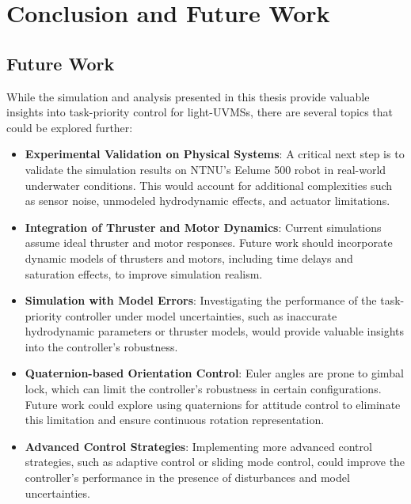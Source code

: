 \chapter{Conclusion and Future Work}

\section{Future Work}

While the simulation and analysis presented in this thesis provide valuable 
insights into task-priority control for light-UVMSs, there are several topics
that could be explored further:

\begin{itemize}
    \item \textbf{Experimental Validation on Physical Systems}: A critical next step is to 
validate the simulation results on NTNU's Eelume 500 robot in real-world 
underwater conditions. This would account for additional complexities such as 
sensor noise, unmodeled hydrodynamic effects, and actuator 
limitations.

    \item \textbf{Integration of Thruster and Motor Dynamics}: Current simulations 
        assume ideal thruster and motor responses. Future work should incorporate 
        dynamic models of thrusters and motors, including time delays and saturation 
        effects, to improve simulation realism.

    \item \textbf{Simulation with Model Errors}: Investigating the performance of the 
        task-priority controller under model uncertainties, such as inaccurate 
        hydrodynamic parameters or thruster models, would provide valuable insights 
        into the controller's robustness.

    \item \textbf{Quaternion-based Orientation Control}: Euler angles are prone to gimbal lock, which can limit the controller's robustness in certain configurations. Future work could explore using quaternions for attitude control to eliminate this limitation and ensure continuous rotation representation.

    \item \textbf{Advanced Control Strategies}: Implementing more advanced control 
        strategies, such as adaptive control or sliding mode control, could improve
        the controller's performance in the presence of disturbances and model
        uncertainties.

\end{itemize}

